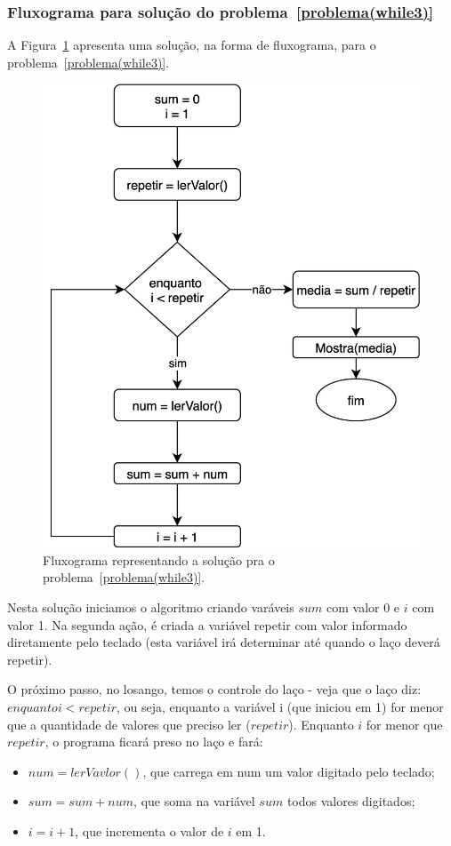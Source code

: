 \subsubsection*{Fluxograma para solução do problema~\ref{problema(while3)}}
A Figura~\ref{fig:fluxogramaproblema3} apresenta uma solução, na forma de fluxograma, para o problema~\ref{problema(while3)}.
\begin{figure}[h]
  \begin{center}
    \includegraphics[width=0.5\linewidth]{img/problemaWhile3.png}
    \caption{Fluxograma representando a solução pra o problema~\ref{problema(while3)}.}
    \label{fig:fluxogramaproblema3}
  \end{center}
\end{figure}

Nesta solução iniciamos o algoritmo criando varáveis $sum$ com valor 0 e $i$ com valor 1. Na segunda ação, é criada a variável repetir com valor informado diretamente pelo teclado (esta variável irá determinar até quando o laço deverá repetir). 

O próximo passo, no losango, temos o controle do laço - veja que o laço diz: $enquanto i<repetir$, ou seja, enquanto a variável i (que iniciou em 1) for menor que a quantidade de valores que preciso ler ($repetir$). Enquanto $i$ for menor que $repetir$, o programa ficará preso no laço e fará:
\begin{itemize}
  \item $num = lerVavlor()$, que carrega em num um valor digitado pelo teclado;
  \item $sum = sum + num$, que soma na variável $sum$ todos valores digitados;
  \item $i = i + 1$, que incrementa o valor de $i$ em 1.
\end{itemize}


